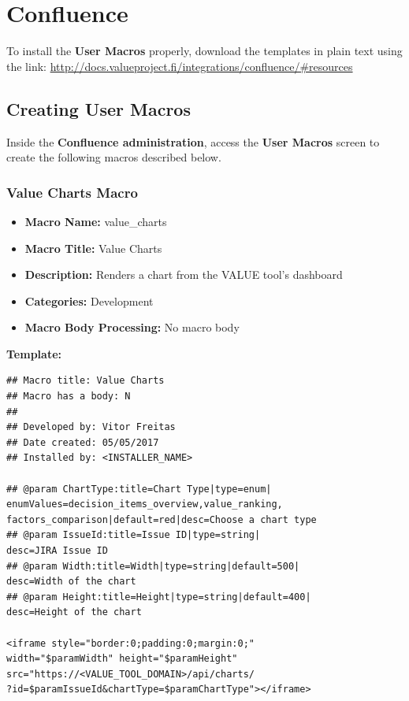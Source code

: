 \documentclass{article}
\begin{document}
\section{Confluence}
\label{confluence}

To install the \textbf{User Macros} properly, download the templates in plain text using the link: \url{http://docs.valueproject.fi/integrations/confluence/#resources}

\subsection{Creating User Macros}
Inside the \textbf{Confluence administration}, access the \textbf{User Macros} screen to create the following macros described below.

\subsubsection{Value Charts Macro}

\begin{itemize}
    \item \textbf{Macro Name:} value\_charts
    \item \textbf{Macro Title:} Value Charts
    \item \textbf{Description:} Renders a chart from the VALUE tool's dashboard
    \item \textbf{Categories:} Development
    \item \textbf{Macro Body Processing:} No macro body
\end{itemize}

\textbf{Template:}

\begin{lstlisting}[frame=single]
## Macro title: Value Charts
## Macro has a body: N
##
## Developed by: Vitor Freitas
## Date created: 05/05/2017
## Installed by: <INSTALLER_NAME>

## @param ChartType:title=Chart Type|type=enum|
enumValues=decision_items_overview,value_ranking,
factors_comparison|default=red|desc=Choose a chart type
## @param IssueId:title=Issue ID|type=string|
desc=JIRA Issue ID
## @param Width:title=Width|type=string|default=500|
desc=Width of the chart
## @param Height:title=Height|type=string|default=400|
desc=Height of the chart

<iframe style="border:0;padding:0;margin:0;"
width="$paramWidth" height="$paramHeight"
src="https://<VALUE_TOOL_DOMAIN>/api/charts/
?id=$paramIssueId&chartType=$paramChartType"></iframe>
\end{lstlisting}
\end{document}
